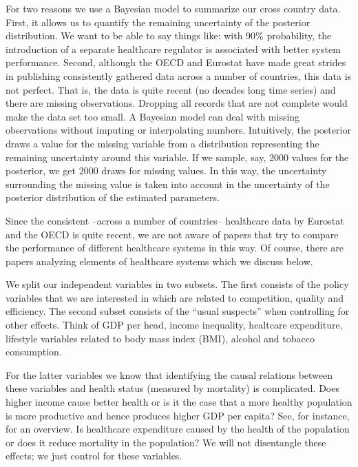 \documentclass[a4paper,12pt]{article}
\begin{document}
For two reasons we use a Bayesian model to summarize our cross country data. First, it allows us to quantify the remaining uncertainty of the posterior distribution. We want to be able to say things like: with 90\% probability, the introduction of a separate healthcare regulator is associated with better system performance. Second, although the OECD and Eurostat have made great strides in publishing consistently gathered data across a number of countries, this data is not perfect. That is, the data is quite recent (no decades long time series) and there are missing observations. Dropping all records that are not complete would make the data set too  small. A Bayesian model can deal with missing observations without imputing or interpolating numbers. Intuitively, the posterior draws a value for the missing variable from a distribution representing the remaining uncertainty around this variable. If we sample, say, 2000 values for the posterior, we get 2000 draws for missing values. In this way, the uncertainty surrounding the missing value is taken into account in the uncertainty of the posterior distribution of the estimated parameters.

Since the consistent --across a number of countries-- healthcare data by Eurostat and the OECD is quite recent, we are not aware of papers that try to compare the performance of different healthcare systems in this way. Of course, there are papers analyzing elements of healthcare systems which we discuss below.

We split our independent variables in two subsets. The first consists of the policy variables that we are interested in which are related to competition, quality and efficiency. The second subset consists of the ``usual suspects'' when controlling for other effects. Think of GDP per head, income inequality, healtcare expenditure, lifestyle variables related to body mass index (BMI), alcohol and tobacco consumption.

For the latter variables we know that identifying the causal relations between these variables and health status (measured by mortality) is complicated. Does higher income cause better health or is it the case that a more healthy population is more productive and hence produces higher GDP per capita? See, for instance, \cite{socioeconomicstatus} for an overview. Is healthcare expenditure caused by the health of the population or does it reduce mortality in the population? We will not disentangle these effects; we just control for these variables.
\end{document}
